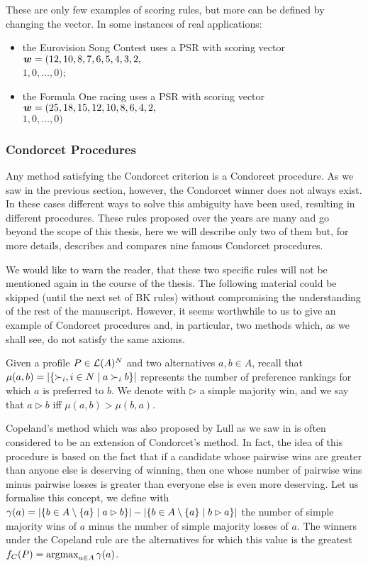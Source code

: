 \noindent These are only few examples of scoring rules, but more can be defined by changing the vector. In some instances of real applications: 
\begin{itemize}
	\item the Eurovision Song Contest uses a \acs{PSR} with scoring vector $\bm{w}=(12,10,8,7,6,5,4,3,2,$ \\$1,0, \dots,0)$;
	\item the Formula One racing uses a \acs{PSR} with scoring vector
	$\bm{w}=(25,18,15,12,10,8,6,4,2,$\\$1,0,\dots,0)$
\end{itemize}




\subsubsection*{Condorcet Procedures}
Any method satisfying the Condorcet criterion is a Condorcet procedure. As we saw in the previous section, however, the Condorcet winner does not always exist. In these cases different ways to solve this ambiguity have been used, resulting in different procedures. These rules proposed over the years are many and go beyond the scope of this thesis, here we will describe only two of them but, for more details, \citet{Fishburn1977} describes and compares nine famous Condorcet procedures.

We would like to warn the reader, that these two specific rules will not be mentioned again in the course of the thesis.
The following material could be skipped (until the next set of BK rules) without compromising the understanding of the rest of the manuscript.
However, it seems worthwhile to us to give an example of Condorcet procedures and, in particular, two methods which, as we shall see, do not satisfy the same axioms.

Given a profile $P\in\mathcal{L}(A)^{N}$ and two alternatives $a,b\in A$, recall that $\mu(a,b)=|\{\mathop{\prefi}, i \in N \suchthat a\prefi b\}|$ represents the number of preference rankings for which $a$ is preferred to $b$.
We denote with $\rhd$ a simple majority win, and we say that $a \rhd b$ iff $\mu(a,b)>\mu(b,a)$.

\begin{indented}[Copeland]
	Copeland's method \textemdash which was also proposed by Lull as we saw in  \textemdash is often considered to be an extension of Condorcet's method. 
	In fact, the idea of this procedure is based on the fact that if a candidate whose pairwise wins are greater than anyone else is deserving of winning, then one whose number of pairwise wins minus pairwise losses is greater than everyone else is even more deserving.
	Let us formalise this concept, we define with $\gamma(a)=|\{b \in A\setminus \{a\} \suchthat a \rhd b\}|- |\{b \in A\setminus \{a\} \suchthat b \rhd a\}|$ the number of simple majority wins of $a$ minus the number of simple majority losses of $a$.
	The winners under the Copeland rule are the alternatives for which this value is the greatest $f_{C}(P)=\operatorname*{argmax}_{a\in A}\gamma(a)$.
\end{indented}

